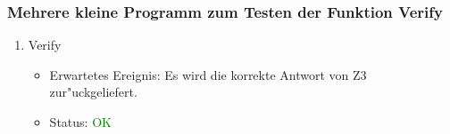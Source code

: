 \subsubsection{Mehrere kleine Programm zum Testen der Funktion Verify}
\begin{enumerate}
\item Verify
\begin{itemize}
\item Erwartetes Ereignis: Es wird die korrekte Antwort von Z3 zur"uckgeliefert.
\item Status: \textcolor{green}{OK}
\end{itemize}
\end{enumerate}